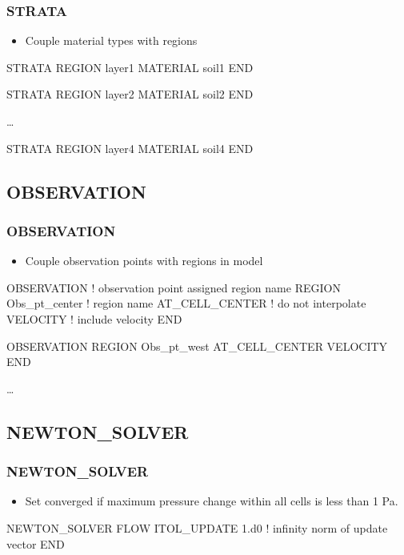 \documentclass{beamer}
\newcommand\bluecomment[1]{{{\color{blue} #1}}}
\begin{document}
\begin{frame}[fragile]\frametitle{STRATA}

\begin{itemize}
\item Couple material types with regions
\end{itemize}

\begin{semiverbatim}
STRATA
  REGION layer1
  MATERIAL soil1
END

STRATA
  REGION layer2
  MATERIAL soil2
END

\ldots

STRATA
  REGION layer4
  MATERIAL soil4
END
\end{semiverbatim}

\end{frame}


\subsection{OBSERVATION}

\begin{frame}[fragile]\frametitle{OBSERVATION}

\begin{itemize}
\item Couple observation points with regions in model
\end{itemize}

\begin{semiverbatim}
OBSERVATION  \bluecomment{! observation point assigned region name}
  REGION Obs_pt_center  \bluecomment{! region name}
  AT_CELL_CENTER        \bluecomment{! do not interpolate}
  VELOCITY              \bluecomment{! include velocity}
END

OBSERVATION
  REGION Obs_pt_west
  AT_CELL_CENTER
  VELOCITY
END

\dots
\end{semiverbatim}

\end{frame}

\subsection{NEWTON\_SOLVER}

\begin{frame}[fragile]\frametitle{NEWTON\_SOLVER}

\begin{itemize}
  \item Set converged if maximum pressure change within all cells is less than 1 Pa.
\end{itemize}

\begin{semiverbatim}

NEWTON_SOLVER FLOW
  ITOL_UPDATE 1.d0   \bluecomment{! infinity norm of update vector}
END
\end{semiverbatim}

\end{frame}
\end{document}
